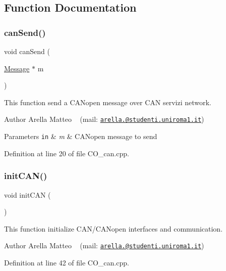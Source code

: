 \subsection{Function Documentation}
\mbox{\label{group___c_a_n__network__module_ga44cc9b79c50c2c8eef6b98bac0d24dc9}} 
\subsubsection{\texorpdfstring{can\+Send()}{canSend()}}
{\footnotesize\ttfamily void can\+Send (\begin{DoxyParamCaption}\item[{\mbox{\hyperlink{struct_message}{Message}} $\ast$}]{m }\end{DoxyParamCaption})}



This function send a C\+A\+Nopen message over C\+AN servizi network. 

\begin{DoxyAuthor}{Author}
Arella Matteo ~\newline
 (mail\+: \href{mailto:arella.1646983@studenti.uniroma1.it}{\tt arella.@studenti.\+uniroma1.\+it})
\end{DoxyAuthor}

\begin{DoxyParams}[1]{Parameters}
\mbox{\tt in}  & {\em m} & C\+A\+Nopen message to send \\
\hline
\end{DoxyParams}


Definition at line 20 of file C\+O\+\_\+can.\+cpp.

\mbox{\label{group___c_a_n__network__module_gaee4f95b5d4a9e9c330f3a9169464860a}} 
\subsubsection{\texorpdfstring{init\+C\+A\+N()}{initCAN()}}
{\footnotesize\ttfamily void init\+C\+AN (\begin{DoxyParamCaption}{ }\end{DoxyParamCaption})}



This function initialize C\+A\+N/\+C\+A\+Nopen interfaces and communication. 

\begin{DoxyAuthor}{Author}
Arella Matteo ~\newline
 (mail\+: \href{mailto:arella.1646983@studenti.uniroma1.it}{\tt arella.@studenti.\+uniroma1.\+it}) 
\end{DoxyAuthor}


Definition at line 42 of file C\+O\+\_\+can.\+cpp.

